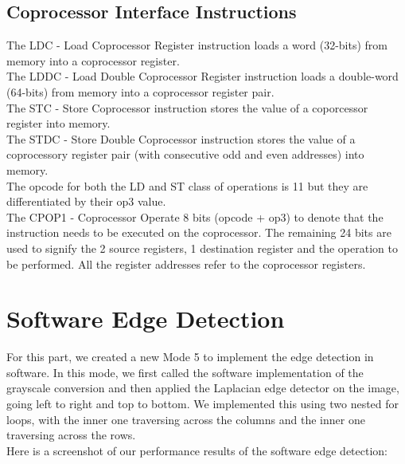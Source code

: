 \documentclass{article}
\begin{document}
\subsection{Coprocessor Interface Instructions}
	The LDC - Load Coprocessor Register instruction loads a word (32-bits) from memory into a coprocessor register.\\
	
	The LDDC - Load Double Coprocessor Register instruction loads a double-word (64-bits) from memory into a coprocessor register pair.\\
	
	The STC - Store Coprocessor instruction stores the value of a coporcessor register into memory.\\
	
	The STDC - Store Double Coprocessor instruction stores the value of a coprocessory register pair (with consecutive odd and even addresses) into memory.\\
	
	The opcode for both the LD and ST class of operations is 11 but they are differentiated by their op3 value.\\
	
	The CPOP1 - Coprocessor Operate 8 bits (opcode + op3) to denote that the instruction needs to be executed on the coprocessor. The remaining 24 bits are used to signify the 2 source registers, 1 destination register and the operation to be performed. All the register addresses refer to the coprocessor registers.



\section{Software Edge Detection}

For this part, we created a new Mode 5 to implement the edge detection in software. In this mode, we first called the software implementation of the grayscale conversion and then applied the Laplacian edge detector on the image, going left to right and top to bottom. We implemented this using two nested for loops, with the inner one traversing across the columns and the inner one traversing across the rows.\\

Here is a screenshot of our performance results of the software edge detection:
\end{document}
